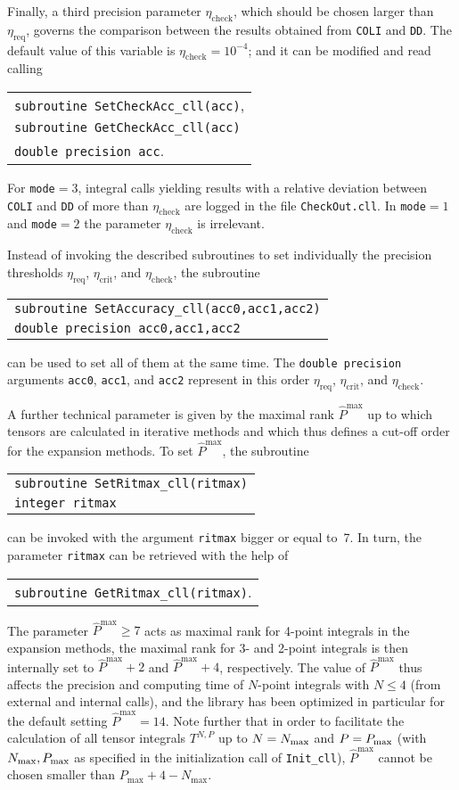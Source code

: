 \documentclass[preprint,sort&compress,12pt]{elsarticle}
\makeatletter
\def\bce{\begin{center}}
\def\ece{\end{center}}
\newlength{\parwidth}\newlength{\colonewidth}%
\newcommand{\cpcsub}[1]
{%
\setlength{\parwidth}{\textwidth}\addtolength{\parwidth}{-2.1em}%
\bce
\begin{tabular}[t]{@{}p{\parwidth}@{}}
#1
\end{tabular}
\ece
}%
\makeatother
\begin{document}
Finally, a third precision parameter $\eta_\textrm{check}$, which
should be chosen larger than $\eta_\textrm{req}$, governs the
comparison between the results obtained from {\tt COLI} and {\tt DD}.
The default value of this variable is $\eta_\textrm{check}=10^{-4}$;
and it can be modified and read calling 
\cpcsub{
  {\tt subroutine  SetCheckAcc\_cll(acc)}\;,\\
  {\tt subroutine  GetCheckAcc\_cll(acc)} \\
  {\tt double precision acc}\;. \\
  } 
For {\tt mode${=}3$}, integral calls yielding results with a
relative deviation between {\tt COLI} and {\tt DD} of more than
$\eta_\textrm{check}$ are logged in the file {\tt CheckOut.cll}. In
{\tt mode${=}1$} and {\tt mode${=}2$} the parameter $\eta_\textrm{check}$
is irrelevant.

Instead of invoking the described subroutines to set individually the precision thresholds $\eta_\textrm{req}$, $\eta_\textrm{crit}$, and
$\eta_\textrm{check}$, the subroutine 
\cpcsub{
{\tt subroutine  SetAccuracy\_cll(acc0,acc1,acc2)} \\
{\tt double precision acc0,acc1,acc2} \\
}
can be used to set all of them at the same time. 
The {\tt double precision} arguments {\tt acc0}, {\tt acc1}, and {\tt acc2} represent
in this order $\eta_\textrm{req}$, $\eta_\textrm{crit}$, and
$\eta_\textrm{check}$.

A further technical parameter is given by the maximal rank
$\widehat{P}^\textrm{max}$ up to which tensors are calculated in
iterative methods and which thus defines a cut-off order for the
expansion methods. To set $\widehat{P}^\textrm{max}$, the subroutine
\cpcsub{
  {\tt subroutine  SetRitmax\_cll(ritmax)} \\
  {\tt integer ritmax} \\
  } 
can be invoked with the argument {\tt ritmax} bigger or equal to~7.
In turn, the parameter {\tt ritmax} can be retrieved with the help of
\cpcsub{
  {\tt subroutine  GetRitmax\_cll(ritmax)}\;. \\
  } 
The parameter $\widehat{P}^\textrm{max}\ge 7$ acts as maximal rank
for 4-point integrals in the expansion methods, 
the maximal rank for 3- and 2-point integrals
is then internally set to $\widehat{P}^\textrm{max}+2$ and
$\widehat{P}^\textrm{max}+4$, respectively. 
The value of $\widehat{P}^\textrm{max}$ thus affects the precision and
computing time of $N$-point integrals with $N\le 4$ (from external and internal calls), and
the library has been optimized in particular for the  default setting $\widehat{P}^\textrm{max}=14$.
Note further that in order to facilitate the calculation of all tensor integrals $T^{N,P}$ up to
$N= N_{\rm max}$ and $P= P_{\rm max}$ (with $N_{\rm max},P_{\rm max}$ as specified in the initialization
call of {\tt Init\_cll}), $\widehat{P}^\textrm{max}$ cannot be chosen smaller than
$P_{\textrm{max}}+4-N_{\textrm{max}}$.
\end{document}
